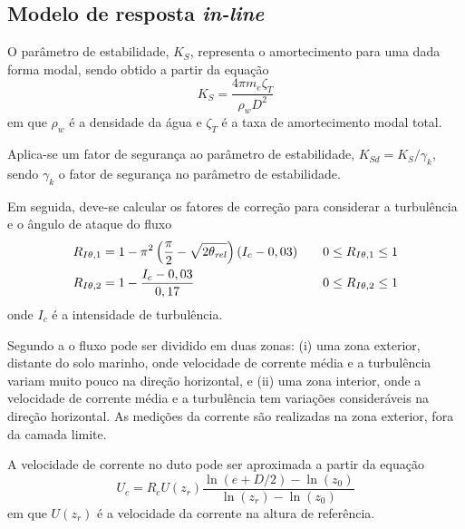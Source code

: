 \subsection{Modelo de resposta \textit{in-line}}
\label{sec:modelo-resposta-inline}

O parâmetro de estabilidade, $K_S$, representa o amortecimento para uma dada forma modal, sendo obtido a partir da equação
\begin{equation}
\label{eq:jdsn-Ks}
K_S = \frac{4 \pi m_e \zeta_T}{\rho_w D^2}
\end{equation}
em que $\rho_w$ é a densidade da água e $\zeta_T$ é a taxa de amortecimento modal total.

Aplica-se um fator de segurança ao parâmetro de estabilidade, $K_\mathit{Sd} = K_S/\gamma_k$, sendo $\gamma_k$ o fator de segurança no parâmetro de estabilidade. 

Em seguida, deve-se calcular os fatores de correção para considerar a turbulência e o ângulo de ataque do fluxo
\begin{equation}	
\label{eq:jdsn-Riot}
\begin{aligned}
	R_{I\theta,1} &= 1 - \pi^2\left(\frac{\pi}{2} - \sqrt{2 \theta_\mathit{rel}}\right)(I_c - 0,03) & \quad \mbox 0 \leq R_{I\theta,1} \leq 1\\
    R_{I\theta,2} &= 1 - \frac{I_c - 0,03}{0,17}                                                    & \quad \mbox  0 \leq R_{I\theta,2} \leq 1 
\end{aligned}
\end{equation}
onde $I_c$ é a intensidade de turbulência.

Segundo a  o fluxo pode ser dividido em duas zonas:
(i) uma zona exterior, distante do solo marinho, onde velocidade de corrente média e a turbulência variam muito pouco na direção horizontal, e 
(ii) uma zona interior, onde a velocidade de corrente média e a turbulência tem variações consideráveis na direção horizontal. As medições da corrente são realizadas na zona exterior, fora da camada limite.

A velocidade de corrente no duto pode ser aproximada a partir da equação
\begin{equation}
\label{eq:jdsn-eq1}
U_c = R_c U(z_r) \frac{\ln{(e+D/2)} - \ln(z_0)}{\ln (z_r)- \ln (z_0)}
\end{equation}
em que $U(z_r)$ é a velocidade da corrente na altura de referência.



